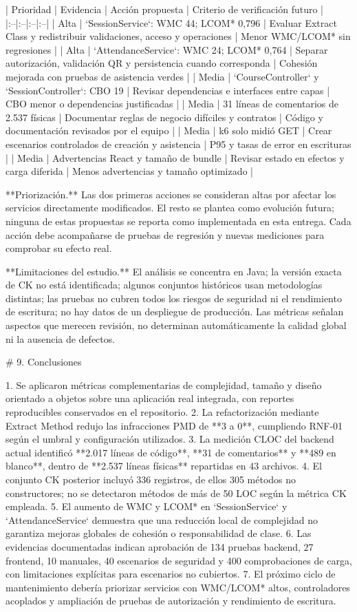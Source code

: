 | Prioridad | Evidencia | Acción propuesta | Criterio de verificación futuro |
|:--|:--|:--|:--|
| Alta | `SessionService`: WMC 44; LCOM* 0,796 | Evaluar Extract Class y redistribuir validaciones, acceso y operaciones | Menor WMC/LCOM* sin regresiones |
| Alta | `AttendanceService`: WMC 24; LCOM* 0,764 | Separar autorización, validación QR y persistencia cuando corresponda | Cohesión mejorada con pruebas de asistencia verdes |
| Media | `CourseController` y `SessionController`: CBO 19 | Revisar dependencias e interfaces entre capas | CBO menor o dependencias justificadas |
| Media | 31 líneas de comentarios de 2.537 físicas | Documentar reglas de negocio difíciles y contratos | Código y documentación revisados por el equipo |
| Media | k6 solo midió GET | Crear escenarios controlados de creación y asistencia | P95 y tasas de error en escrituras |
| Media | Advertencias React y tamaño de bundle | Revisar estado en efectos y carga diferida | Menos advertencias y tamaño optimizado |

**Priorización.** Las dos primeras acciones se consideran altas por afectar los servicios directamente modificados. El resto se plantea como evolución futura; ninguna de estas propuestas se reporta como implementada en esta entrega. Cada acción debe acompañarse de pruebas de regresión y nuevas mediciones para comprobar su efecto real.

**Limitaciones del estudio.** El análisis se concentra en Java; la versión exacta de CK no está identificada; algunos conjuntos históricos usan metodologías distintas; las pruebas no cubren todos los riesgos de seguridad ni el rendimiento de escritura; no hay datos de un despliegue de producción. Las métricas señalan aspectos que merecen revisión, no determinan automáticamente la calidad global ni la ausencia de defectos.

# 9. Conclusiones

1. Se aplicaron métricas complementarias de complejidad, tamaño y diseño orientado a objetos sobre una aplicación real integrada, con reportes reproducibles conservados en el repositorio.
2. La refactorización mediante Extract Method redujo las infracciones PMD de **3 a 0**, cumpliendo RNF-01 según el umbral y configuración utilizados.
3. La medición CLOC del backend actual identificó **2.017 líneas de código**, **31 de comentarios** y **489 en blanco**, dentro de **2.537 líneas físicas** repartidas en 43 archivos.
4. El conjunto CK posterior incluyó 336 registros, de ellos 305 métodos no constructores; no se detectaron métodos de más de 50 LOC según la métrica CK empleada.
5. El aumento de WMC y LCOM* en `SessionService` y `AttendanceService` demuestra que una reducción local de complejidad no garantiza mejoras globales de cohesión o responsabilidad de clase.
6. Las evidencias documentadas indican aprobación de 134 pruebas backend, 27 frontend, 10 manuales, 40 escenarios de seguridad y 400 comprobaciones de carga, con limitaciones explícitas para escenarios no cubiertos.
7. El próximo ciclo de mantenimiento debería priorizar servicios con WMC/LCOM* altos, controladores acoplados y ampliación de pruebas de autorización y rendimiento de escritura.

